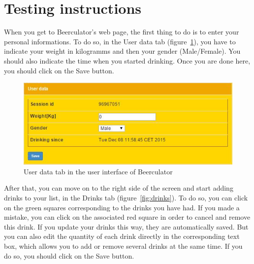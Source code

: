 \section{Testing instructions}
\label{sec:test}

When you get to Beerculator's web page, the first thing to do is to enter your personal informations. To do so, in the \guillemotleft{} User data \guillemotright{} tab ({\sc figure}~\ref{fig:userData}), you have to indicate your weight in kilogramms and then your gender (Male/Female). You should also indicate the time when you started drinking. Once you are done here, you should click on the \guillemotleft{} Save \guillemotright{} button.\\

\begin{figure}[H]
	\centering
   \includegraphics[scale=0.65]{./figures/userData.jpg}
   \caption{User data tab in the user interface of Beerculator}
   \label{fig:userData}
\end{figure}

After that, you can move on to the right side of the screen and start adding drinks to your list, in the \guillemotleft{} Drinks \guillemotright{} tab ({\sc figure}~\ref{fig:drinks}). To do so, you can click on the green squares corresponding to the drinks you have had. If you made a mistake, you can click on the associated red square in order to cancel and remove this drink. If you update your drinks this way, they are automatically saved. But you can also edit the quantity of each drink directly in the corresponding text box, which allows you to add or remove several drinks at the same time. If you do so, you should click on the \guillemotleft{} Save \guillemotright{} button.\\


